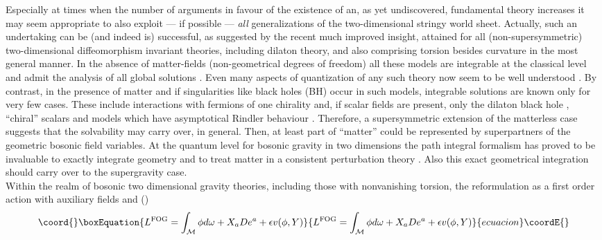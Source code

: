 \documentclass[a4paper,10pt]{article}
\providecommand{\BMf}{\mathcal{M}}
\providecommand{\Action}{L}
\renewcommand{\^}{{}^}
\renewcommand{\_}{\!{}_}
\begin{document}
Especially at times when the number of arguments in favour of the
existence of an, as yet undiscovered, fundamental theory 
increases 
\cite{Vafa:1996xn} it may seem appropriate to also exploit --- if
possible --- \emph{all}  generalizations of the
two-dimensional stringy world sheet. Actually, such an undertaking can
be (and indeed is) successful, as suggested by the recent much
improved insight, attained for all (non-supersymmetric)
two-dimensional diffeomorphism invariant theories, including dilaton
theory, and also comprising torsion besides curvature \cite{Katanaev:1986wk} 
in the most general manner. In the absence of
matter-fields (non-geometrical degrees of freedom) all these models
are integrable at the classical level and admit the analysis of all
global solutions \cite{Katanaev:1993fu}. 
 Even many aspects of quantization
of any such theory now seem to be well understood
\cite{Kummer:1997hy}. 
By contrast, in the presence of matter and if singularities like black
holes (BH) occur in such models, integrable solutions are known only for
very few cases. These include interactions with fermions of one
chirality \cite{kummer92} and, if scalar fields are present, only the
dilaton black hole \cite{Mandal:1991tz}, ``chiral'' scalars 
\cite{Strobl:1998ch} and models which have
asymptotical Rindler behaviour \cite{Fabbri:1996bz}.  Therefore, a
supersymmetric extension of the matterless case suggests that the
solvability may carry over, in general. Then, at least part 
of  ``matter'' could be
represented by superpartners of the geometric bosonic field 
variables. At the quantum level for bosonic gravity in two 
dimensions the path integral formalism has proved 
to be invaluable to exactly integrate geometry and to treat 
matter in a consistent perturbation theory \cite{Kummer:1997jj}. 
Also this exact geometrical integration should carry over to 
the supergravity case.\\ 
Within the realm of bosonic two dimensional gravity theories, 
including those with nonvanishing torsion, the reformulation 
as a first order action \cite{Schaller:1994es,Strobl:1999Habil} 
 with auxiliary fields 
\myHighlight{$\phi$}\coordHE{} and \coordHE{} (\coordHE{}) 
\begin{equation}\coord{}\boxEquation{
  \Action^\mathrm{FOG} = \int_\BMf \phi d\omega + X_a De^a + \epsilon
  v(\phi,Y) 
  \label{FOG}
}{
  \Action^\mathrm{FOG} = \int_\BMf \phi d\omega + X_a De^a + \epsilon
  v(\phi,Y) 
  }{ecuacion}\coordE{}\end{equation}
\end{document}
